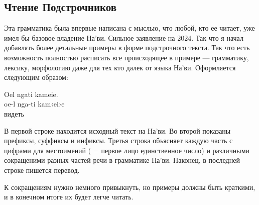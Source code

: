 \subsection{Чтение Подстрочников}
Эта грамматика была впервые написана с мыслью, что любой, кто ее
читает,
уже имел бы базовое владение На'ви. Сильное заявление на 2024.
Так что я начал добавлять более детальные примеры в форме
подстрочного текста. Так что есть возможность полностью
расписать все происходящее в примере — грамматику, лексику,
морфологию даже для тех кто далек от языка На'ви. Оформляется
следующим образом:

\begin{interlin}
 \glll Oel ngati kameie. \\
     oe-l nga-ti kam‹ei›e \\
       видеть \\
\end{interlin}

\noindent В первой строке находится исходный текст на На'ви. Во
второй показаны префиксы, суффиксы и инфиксы. Третья строка
объясняет каждую часть с цифрами для местоимений ( =
первое лицо
единственное число) и различными сокращеними разных частей речи в
грамматике На'ви. Наконец, в последней строке пишется перевод.

К сокращениям нужно немного привыкнуть, но примеры должны быть
краткими, и в конечном итоге их будет легче читать.

